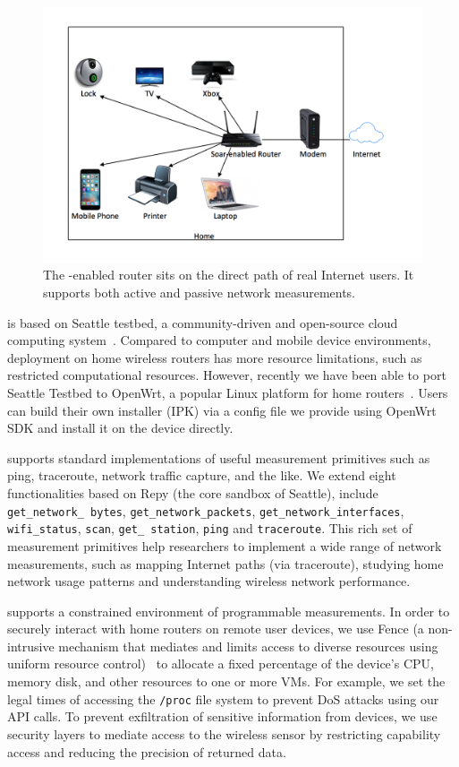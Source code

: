 \begin{figure}%
\centering
\includegraphics[width=0.8\columnwidth]{figure/home-network.png}
\caption{The \sysname-enabled router sits on the direct path of real 
Internet users. It supports both active and passive network measurements.}
\label{figure:design}
\end{figure}


\sysname is based on Seattle testbed, a community-driven and open-source cloud computing system~\cite{zhuang2013experience,cappos2009seattle}. Compared to computer and mobile device environments, deployment on home wireless routers has more resource limitations, such as restricted computational resources. However, recently we have been able to port Seattle Testbed to OpenWrt, a popular Linux platform for home routers~\cite{openwrt}. Users can build their own \sysname installer (IPK) via a config file we provide using OpenWrt SDK and install it on the device directly. 


\sysname supports standard implementations of useful measurement primitives such as ping, traceroute, network traffic capture, and the like. We extend eight functionalities based on Repy (the core sandbox of Seattle), include 
\texttt{get\_network\_
bytes}, \texttt{get\_network\_packets}, \texttt{get\_network\_interfaces}, \texttt{wifi\_status}, \texttt{scan}, \texttt{get\_
station}, \texttt{ping} and \texttt{traceroute}. This rich set of measurement primitives help researchers to implement a wide range of network measurements, such as mapping Internet paths (via traceroute), studying home network usage patterns and understanding wireless network performance.

\sysname supports a constrained environment of programmable measurements. In order to securely interact with home routers on remote user devices, we use Fence (a non-intrusive mechanism that mediates and limits access to diverse resources using uniform resource control)~\cite{li2015fence} to allocate a fixed percentage of the device's CPU, memory disk, and other resources to one or more VMs. For example, we set the legal times of accessing the \texttt{/proc} file system to prevent DoS attacks using our API calls. To prevent exfiltration of sensitive information from devices, we use security layers to mediate access to the wireless sensor by restricting capability access and reducing the precision of returned data. 


